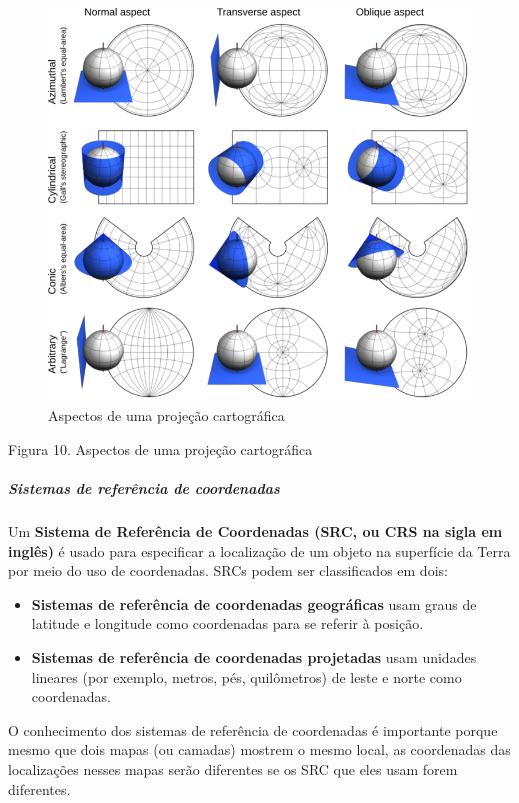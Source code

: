 \documentclass[
]{book}
\providecommand{\tightlist}{%
  \setlength{\itemsep}{0pt}\setlength{\parskip}{0pt}}
\begin{document}
\begin{figure}
\centering
\includegraphics{media/modulo0/aspects.png}
\caption{Aspectos de uma projeção cartográfica}
\end{figure}

Figura 10. Aspectos de uma projeção cartográfica

\hypertarget{sistemas-de-referuxeancia-de-coordenadas}{%
\subparagraph{Sistemas de referência de coordenadas}\label{sistemas-de-referuxeancia-de-coordenadas}}

Um \textbf{Sistema de Referência de Coordenadas (SRC, ou CRS na sigla em inglês)} é usado para especificar a localização de um objeto na superfície da Terra por meio do uso de coordenadas. SRCs podem ser classificados em dois:

\begin{itemize}
\tightlist
\item
  \textbf{Sistemas de referência de coordenadas geográficas} usam graus de latitude e longitude como coordenadas para se referir à posição.
\item
  \textbf{Sistemas de referência de coordenadas projetadas} usam unidades lineares (por exemplo, metros, pés, quilômetros) de leste e norte como coordenadas.
\end{itemize}

O conhecimento dos sistemas de referência de coordenadas é importante porque mesmo que dois mapas (ou camadas) mostrem o mesmo local, as coordenadas das localizações nesses mapas serão diferentes se os SRC que eles usam forem diferentes.
\end{document}
